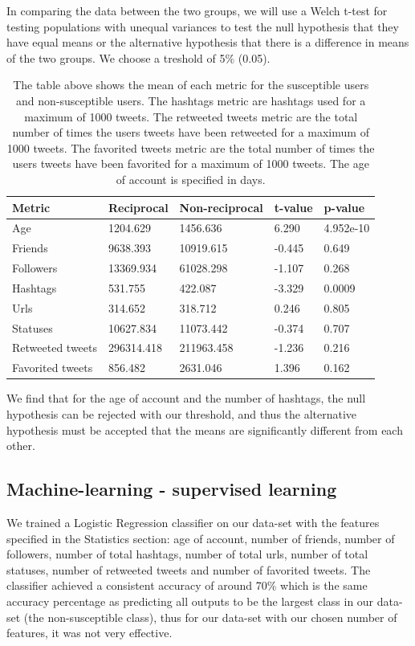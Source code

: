 \documentclass[10pt]{IEEEtran}
\begin{document}
In comparing the data between the two groups, we will use a Welch t-test for testing populations with unequal variances to test the null hypothesis that they have equal means or the alternative hypothesis that there is a difference in means of the two groups.
We choose a treshold of 5\% (0.05).
\begin{table}[H]
\centering
\begin{tabular}{lllll}
\hline
Metric & Reciprocal & Non-reciprocal & t-value & p-value \\ \hline
Age & 1204.629 & 1456.636 & 6.290 & 4.952e-10\\
Friends & 9638.393 & 10919.615 & -0.445 & 0.649 \\
Followers & 13369.934 & 61028.298 & -1.107 & 0.268 \\
Hashtags & 531.755 & 422.087 & -3.329 & 0.0009 \\
Urls & 314.652 & 318.712 & 0.246 & 0.805 \\
Statuses & 10627.834 & 11073.442 & -0.374 & 0.707 \\
Retweeted tweets & 296314.418 & 211963.458 & -1.236 & 0.216 \\
Favorited tweets & 856.482 & 2631.046 & 1.396 & 0.162 \\ \hline
\end{tabular}
\caption{The table above shows the mean of each metric for the susceptible users and non-susceptible users. The hashtags metric are hashtags used for a maximum of 1000 tweets. The retweeted tweets metric are the total number of times the users tweets have been retweeted for a maximum of 1000 tweets. The favorited tweets metric are the total number of times the users tweets have been favorited for a maximum of 1000 tweets. The age of account is specified in days.}
\end{table}
We find that for the age of account and the number of hashtags, the null hypothesis can be rejected with our threshold, and thus the alternative hypothesis must be accepted that the means are significantly different from each other.\\

\subsection{Machine-learning - supervised learning}
We trained a Logistic Regression classifier on our data-set with the features specified in the Statistics section: age of account, number of friends, number of followers, number of total hashtags, number of total urls, number of total statuses, number of retweeted tweets and number of favorited tweets. The classifier achieved a consistent accuracy of around 70\% which is the same accuracy percentage as predicting all outputs to be the largest class in our data-set (the non-susceptible class), thus for our data-set with our chosen number of features, it was not very effective.  
\end{document}
